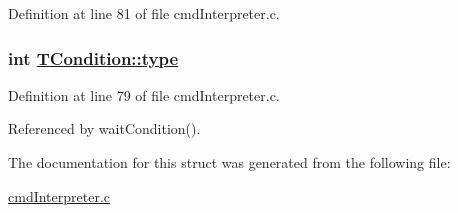 Definition at line 81 of file cmd\-Interpreter.c.\hypertarget{structTCondition_a0f092121f681df301d31ca256804d7b}{
\subsubsection[type]{\setlength{\rightskip}{0pt plus 5cm}int \hyperlink{structTCondition_a0f092121f681df301d31ca256804d7b}{TCondition::type}}}
\label{structTCondition_a0f092121f681df301d31ca256804d7b}




Definition at line 79 of file cmd\-Interpreter.c.

Referenced by wait\-Condition().

The documentation for this struct was generated from the following file:\begin{CompactItemize}
\item 
\hyperlink{cmdInterpreter_8c}{cmd\-Interpreter.c}\end{CompactItemize}
